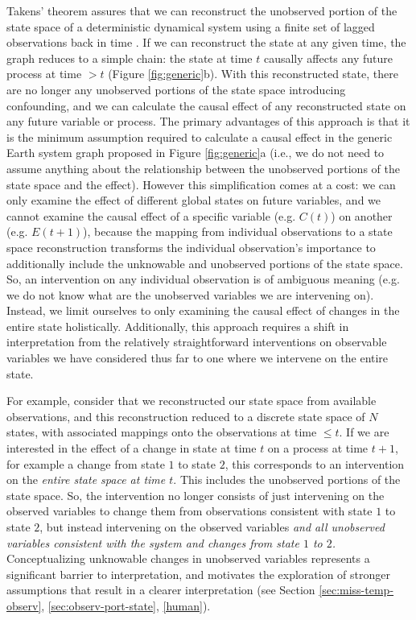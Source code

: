 \documentclass[12pt]{article}
\begin{document}
Takens' theorem assures that we can reconstruct the unobserved portion
of the state space of a deterministic dynamical system using a finite
set of lagged observations back in time
\citep{takens1981detecting,deyle2011generalized,Sugihara496}. If we
can reconstruct the state at any given time, the graph reduces to a
simple chain: the state at time $t$ causally affects any future
process at time $> t$ (Figure \ref{fig:generic}b). With this reconstructed
state, there are no longer any unobserved portions of the state space
introducing confounding, and we can calculate the causal effect of any
reconstructed state on any future variable or process. The primary
advantages of this approach is that it is the minimum assumption
required to calculate a causal effect in the generic Earth system
graph proposed in Figure \ref{fig:generic}a (i.e., we do not need to
assume anything about the relationship between the unobserved portions
of the state space and the effect). However this simplification comes
at a cost: we can only examine the effect of different global states
on future variables, and we cannot examine the causal effect of a
specific variable (e.g. $C(t)$) on another (e.g. $E(t+1)$), because
the mapping from individual observations to a state space
reconstruction transforms the individual observation's importance to
additionally include the unknowable and unobserved portions of the
state space. So, an intervention on any individual observation is of
ambiguous meaning (e.g. we do not know what are the unobserved
variables we are intervening on). Instead, we limit ourselves to only
examining the causal effect of changes in the entire state
holistically. Additionally, this approach requires a shift in
interpretation from the relatively straightforward interventions on
observable variables we have considered thus far to one where we
intervene on the entire state.

For example, consider that we reconstructed our state space from
available observations, and this reconstruction reduced to a discrete
state space of $N$ states, with associated mappings onto the
observations at time $\leq t$. If we are interested in the effect of a
change in state at time $t$ on a process at time $t+1$, for example a
change from state $1$ to state $2$, this corresponds to an
intervention on the \textit{entire state space at time $t$}. This
includes the unobserved portions of the state space. So, the
intervention no longer consists of just intervening on the observed
variables to change them from observations consistent with state $1$
to state $2$, but instead intervening on the observed variables
\emph{and all unobserved variables consistent with the system and
  changes from state $1$ to $2$.}  Conceptualizing unknowable changes
in unobserved variables represents a significant barrier to
interpretation, and motivates the exploration of stronger assumptions
that result in a clearer interpretation (see Section
\ref{sec:miss-temp-observ}, \ref{sec:observ-port-state}, \ref{human}).
\end{document}
